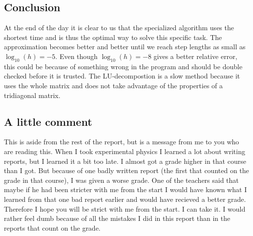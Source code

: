 \documentclass[12pt,a4paper]{article}
\begin{document}
\subsection*{Conclusion}
At the end of the day it is clear to us that the specialized algorithm uses the shortest time and is thus the optimal way to solve this specific task. The approximation becomes better and better until we reach step lengths as small as $\log_{10}(h) = -5$. Even though $\log_{10}(h) = -8$ gives a better relative error, this could be because of something wrong in the program and should be double checked before it is trusted. The LU-decompostion is a slow method because it uses the whole matrix and does not take advantage of the properties of a tridiagonal matrix.
\subsection*{A little comment}
This is aside from the rest of the report, but is a message from me to you who are reading this. When I took experimental physics I learned a lot about writing reports, but I learned it a bit too late. I almost got a grade higher in that course than I got. But because of one badly written report (the first that counted on the grade in that course), I was given a worse grade. One of the teachers said that maybe if he had been stricter with me from the start I would have known what I learned from that one bad report earlier and would have recieved a better grade. Therefore I hope you will be strict with me from the start. I can take it. I would rather feel dumb because of all the mistakes I did in this report than in the reports that count on the grade.
 
\end{document}

